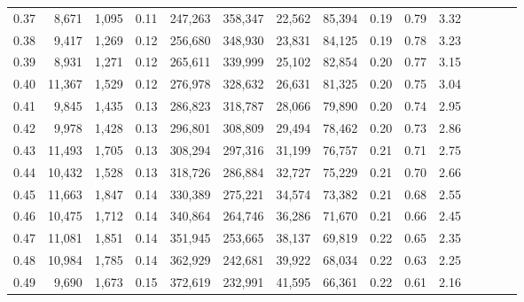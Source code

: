 \begin{tabular}{rrrcrrrrrrrrrrr}
0.37 &   8,671 &  1,095 &                                       0.11 &  247,263 &  358,347 &   22,562 &   85,394 &  0.19 &  0.79 &                         3.32 \\
0.38 &   9,417 &  1,269 &                                       0.12 &  256,680 &  348,930 &   23,831 &   84,125 &  0.19 &  0.78 &                         3.23 \\
0.39 &   8,931 &  1,271 &                                       0.12 &  265,611 &  339,999 &   25,102 &   82,854 &  0.20 &  0.77 &                         3.15 \\
0.40 &  11,367 &  1,529 &                                       0.12 &  276,978 &  328,632 &   26,631 &   81,325 &  0.20 &  0.75 &                         3.04 \\
0.41 &   9,845 &  1,435 &                                       0.13 &  286,823 &  318,787 &   28,066 &   79,890 &  0.20 &  0.74 &                         2.95 \\
0.42 &   9,978 &  1,428 &                                       0.13 &  296,801 &  308,809 &   29,494 &   78,462 &  0.20 &  0.73 &                         2.86 \\
0.43 &  11,493 &  1,705 &                                       0.13 &  308,294 &  297,316 &   31,199 &   76,757 &  0.21 &  0.71 &                         2.75 \\
0.44 &  10,432 &  1,528 &                                       0.13 &  318,726 &  286,884 &   32,727 &   75,229 &  0.21 &  0.70 &                         2.66 \\
0.45 &  11,663 &  1,847 &                                       0.14 &  330,389 &  275,221 &   34,574 &   73,382 &  0.21 &  0.68 &                         2.55 \\
0.46 &  10,475 &  1,712 &                                       0.14 &  340,864 &  264,746 &   36,286 &   71,670 &  0.21 &  0.66 &                         2.45 \\
0.47 &  11,081 &  1,851 &                                       0.14 &  351,945 &  253,665 &   38,137 &   69,819 &  0.22 &  0.65 &                         2.35 \\
0.48 &  10,984 &  1,785 &                                       0.14 &  362,929 &  242,681 &   39,922 &   68,034 &  0.22 &  0.63 &                         2.25 \\
0.49 &   9,690 &  1,673 &                                       0.15 &  372,619 &  232,991 &   41,595 &   66,361 &  0.22 &  0.61 &                         2.16 \\

\end{tabular}
